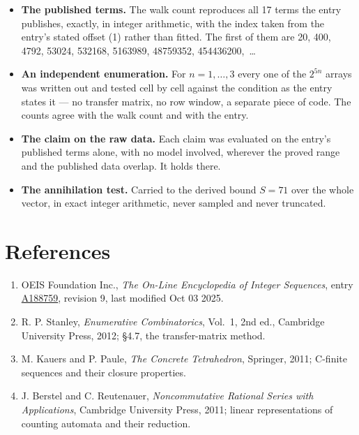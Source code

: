 \documentclass[11pt]{article}
\theoremstyle{definition}
\begin{document}
\begin{itemize}

\item {\bfseries The published terms.} The walk count reproduces all 17 terms the entry publishes, exactly, in integer arithmetic, with the index taken from the entry's stated offset (1) rather than fitted. The first of them are 20, 400, 4792, 53024, 532168, 5163989, 48759352, 454436200,~\dots

\item {\bfseries An independent enumeration.} For $n = 1,\dots,3$ every one of the $2^{5n}$ arrays was written out and tested cell by cell against the condition as the entry states it --- no transfer matrix, no row window, a separate piece of code. The counts agree with the walk count and with the entry.

\item {\bfseries The claim on the raw data.} Each claim was evaluated on the entry's published terms alone, with no model involved, wherever the proved range and the published data overlap. It holds there.

\item {\bfseries The annihilation test.} Carried to the derived bound $S = 71$ over the whole vector, in exact integer arithmetic, never sampled and never truncated.

\end{itemize}

\section{References}

\begin{enumerate}

\item OEIS Foundation Inc., \emph{The On-Line Encyclopedia of Integer Sequences}, entry \href{https://oeis.org/A188759}{A188759}, revision 9, last modified Oct 03 2025.

\item R. P. Stanley, \emph{Enumerative Combinatorics}, Vol.~1, 2nd ed., Cambridge University Press, 2012; \S4.7, the transfer-matrix method.

\item M. Kauers and P. Paule, \emph{The Concrete Tetrahedron}, Springer, 2011; C-finite sequences and their closure properties.

\item J. Berstel and C. Reutenauer, \emph{Noncommutative Rational Series with Applications}, Cambridge University Press, 2011; linear representations of counting automata and their reduction.

\end{enumerate}
\end{document}
